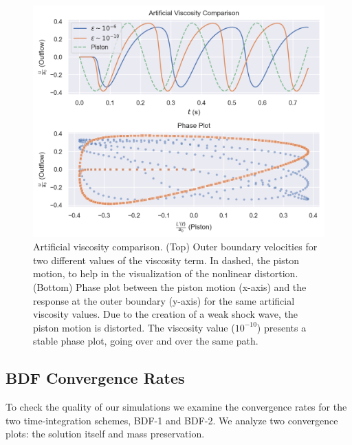 \documentclass[../../thesis.tex]{subfiles}
\begin{document}
\begin{figure}[!h]
    \centering
    \includegraphics[width=1.0\columnwidth]{research_project/piston/figures/artificial_viscosity/artificial_viscosity_comparison.png}
    \caption{Artificial viscosity comparison.
    (Top) Outer boundary velocities for two different values of the viscosity term.
    In dashed, the piston motion, to help in the visualization of the nonlinear distortion.
    (Bottom) Phase plot between the piston motion (x-axis) and the response at the outer boundary (y-axis) for the same artificial viscosity values.
    Due to the creation of a weak shock wave, the piston motion is distorted.
    The viscosity value ($10^{-10}$) presents a stable phase plot, going over and over the same path. 
    }
    \label{fig:artificial_viscosity_comparison}
\end{figure}

\newpage
\subsection{BDF Convergence Rates}
\label{sec:fom_calibration_bdf_convergence_rates}
To check the quality of our simulations we examine 
the convergence rates for the two time-integration schemes, BDF-1 and BDF-2.
We analyze two convergence plots: the solution itself and mass preservation.
\end{document}
